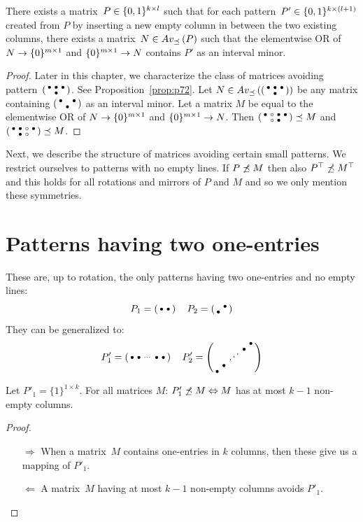 \begin{prop}
There exists a matrix~$P\in\{0,1\}^{k\times l}$ such that for each pattern~$P'\in\{0,1\}^{k\times(l+1)}$ created from $P$ by inserting a new empty column in between the two existing columns, there exists a matrix~$N\in Av_{\preceq}\left(P\right)$ such that the elementwise OR of $N\rightarrow\{0\}^{m\times 1}$ and $\{0\}^{m\times 1}\rightarrow N$ contains $P'$ as an interval minor.
\end{prop}
\begin{proof}
Later in this chapter, we characterize the class of matrices avoiding pattern~$\left(\begin{smallmatrix}\bullet&\bullet&\bullet\\ &\bullet& \end{smallmatrix}\right)$. See Proposition~\ref{prop:p72}. Let $N\in Av_{\preceq}\left(\left(\begin{smallmatrix}\bullet&\bullet&\bullet\\ &\bullet& \end{smallmatrix}\right)\right)$ be any matrix containing $\left(\begin{smallmatrix}\bullet& &\bullet\\ &\bullet& \end{smallmatrix}\right)$ as an interval minor. Let a matrix $M$ be equal to the elementwise OR of $N\rightarrow\{0\}^{m\times 1}$ and $\{0\}^{m\times 1}\rightarrow N$. Then $\left(\begin{smallmatrix}\bullet&\circ&\bullet&\bullet\\ &\circ&\bullet& \end{smallmatrix}\right)\preceq M$ and $\left(\begin{smallmatrix}\bullet&\bullet&\circ&\bullet\\ &\bullet&\circ& \end{smallmatrix}\right)\preceq M$.
\end{proof}

Next, we describe the structure of matrices avoiding certain small patterns. We restrict ourselves to patterns with no empty lines. If $P\not\preceq M$ then also $P^\top\not\preceq M^\top$ and this holds for all rotations and mirrors of $P$ and $M$ and so we only mention these symmetries.

\section{Patterns having two one-entries}
\label{sec:2ones}
These are, up to rotation, the only patterns having two one-entries and no empty lines:
$$P_1=\smm{\bullet&\bullet}\ \ 
\ P_2=\smm{ &\bullet\\\bullet& }$$
They can be generalized to:
$$P'_1=\smm{\bullet&\bullet&\cdots&\bullet&\bullet}\ \ 
\ P'_2=\smm{ & & & &\bullet\\ & & &\bullet& \\ & &\Ddots& & \\ &\bullet& & & \\\bullet& & & & }$$

\begin{prop}
Let $P'_1=\{1\}^{1\times k}$. For all matrices $M$: $P'_1\not\preceq M\Leftrightarrow M$ has at most $k-1$ non-empty columns.
\end{prop}
\begin{proof}
\begin{itemize}
	\item[$\Rightarrow$] When a matrix~$M$ contains one-entries in $k$ columns, then these give us a mapping of $P'_1$.
	\item[$\Leftarrow$] A matrix~$M$ having at most $k-1$ non-empty columns avoids $P'_1$. \qedhere
\end{itemize}
\end{proof}

